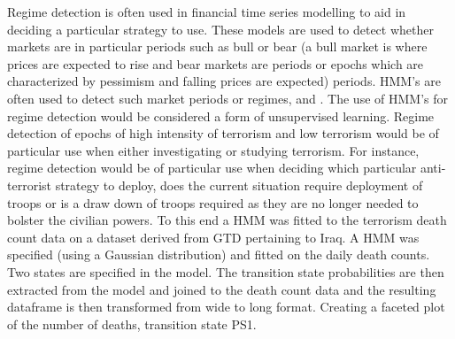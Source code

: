 Regime detection is often used in financial time series modelling to aid in deciding a particular strategy to use. These models are used  to detect whether markets are in particular periods such as bull or bear (a bull market is where prices are expected to rise and bear markets are periods or epochs which are characterized by pessimism and falling prices are expected) periods. HMM’s are often used to detect such market periods or regimes, \citep{RegimeDetection2012} and \citep{bae2014dynamic}. The use of HMM's for regime detection would be considered a form of unsupervised learning. Regime detection of epochs of high intensity of terrorism and low terrorism would be of particular use when either investigating or studying terrorism. For instance, regime detection would be of particular use when deciding which particular anti-terrorist strategy to deploy, does the current situation require deployment of troops or is a draw down of troops required as they are no longer needed to bolster the civilian powers. To this end a HMM was fitted to the terrorism death count data on a dataset derived from GTD pertaining to Iraq. A HMM was specified (using a Gaussian distribution) and fitted on the daily death counts. Two states are specified in the model. The transition state probabilities are then extracted from the model and joined to the death count data and the resulting dataframe is then transformed from wide to long format. Creating a faceted plot of the number of deaths, transition state PS1. 


